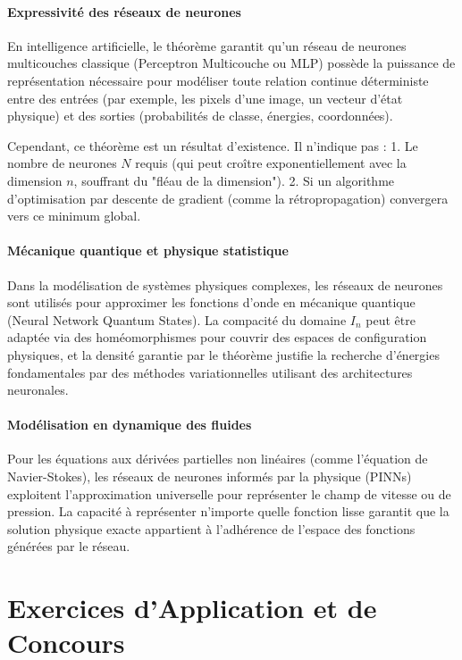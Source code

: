 \documentclass[11pt,a4paper]{article}
\begin{document}
\subsection{Expressivité des réseaux de neurones}

En intelligence artificielle, le théorème garantit qu'un réseau de neurones multicouches classique (Perceptron Multicouche ou MLP) possède la puissance de représentation nécessaire pour modéliser toute relation continue déterministe entre des entrées (par exemple, les pixels d'une image, un vecteur d'état physique) et des sorties (probabilités de classe, énergies, coordonnées).

Cependant, ce théorème est un résultat d'existence. Il n'indique pas :
1. Le nombre de neurones $N$ requis (qui peut croître exponentiellement avec la dimension $n$, souffrant du "fléau de la dimension").
2. Si un algorithme d'optimisation par descente de gradient (comme la rétropropagation) convergera vers ce minimum global.

\subsection{Mécanique quantique et physique statistique}

Dans la modélisation de systèmes physiques complexes, les réseaux de neurones sont utilisés pour approximer les fonctions d'onde en mécanique quantique (Neural Network Quantum States). La compacité du domaine $I_n$ peut être adaptée via des homéomorphismes pour couvrir des espaces de configuration physiques, et la densité garantie par le théorème justifie la recherche d'énergies fondamentales par des méthodes variationnelles utilisant des architectures neuronales.

\subsection{Modélisation en dynamique des fluides}

Pour les équations aux dérivées partielles non linéaires (comme l'équation de Navier-Stokes), les réseaux de neurones informés par la physique (PINNs) exploitent l'approximation universelle pour représenter le champ de vitesse ou de pression. La capacité à représenter n'importe quelle fonction lisse garantit que la solution physique exacte appartient à l'adhérence de l'espace des fonctions générées par le réseau.


\newpage
\part{Exercices d'Application et de Concours}
\end{document}
